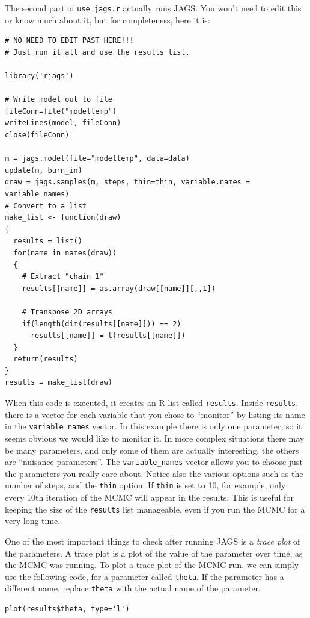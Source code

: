 The second part of {\tt use\_jags.r} actually runs JAGS. You won't need to edit
this or know much about it, but for completeness, here it is:

\begin{framed}
\begin{verbatim}
# NO NEED TO EDIT PAST HERE!!!
# Just run it all and use the results list.

library('rjags')

# Write model out to file
fileConn=file("modeltemp")
writeLines(model, fileConn)
close(fileConn)

m = jags.model(file="modeltemp", data=data)
update(m, burn_in)
draw = jags.samples(m, steps, thin=thin, variable.names = variable_names)
# Convert to a list
make_list <- function(draw)
{
  results = list()
  for(name in names(draw))
  {
    # Extract "chain 1"
    results[[name]] = as.array(draw[[name]][,,1])
    
    # Transpose 2D arrays
    if(length(dim(results[[name]])) == 2)
      results[[name]] = t(results[[name]])
  }
  return(results)
}
results = make_list(draw)
\end{verbatim}
\end{framed}

When this code is executed, it creates an R list called {\tt results}.
Inside {\tt results}, there is a vector
for each variable that you chose to ``monitor'' by listing its name in
the {\tt variable\_names} vector. In this example there is only one parameter,
so it seems obvious we would like to monitor it. In more complex situations there
may be many parameters, and only some of them are actually interesting, the others
are ``nuisance parameters''. The {\tt variable\_names} vector allows you to choose
just the parameters you really care about.
Notice also the various options such as the number of steps, and the {\tt thin}
option. If {\tt thin} is set to 10, for example, only every 10th iteration
of the MCMC will appear in the results. This is useful for keeping the size
of the {\tt results} list manageable, even if you run the MCMC for a very
long time.

One of the most important things to check after running JAGS is a {\it trace
plot} of the parameters. A trace plot is a plot of the value of the parameter
over time, as the MCMC was running.
To plot a trace plot of the MCMC run, we can simply use the following code,
for a parameter called {\tt theta}. If the parameter has a different name,
replace {\tt theta} with the actual name of the parameter.
\begin{framed}
\begin{verbatim}
plot(results$theta, type='l')
\end{verbatim}
\end{framed}

